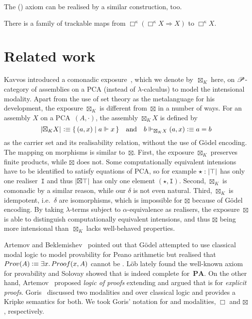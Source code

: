 \documentclass[a4paper,UKenglish,numberwithinsect,cleveref,thm-restate,draft]{lipics-v2021}
\numberwithin{equation}{section}
\theoremstyle{definition}
\theoremstyle{plain}
\begin{document}
The (\GL) axiom can be realised by a similar construction, too.
\begin{theorem}
  There is a family of trackable maps from 
  $\Box^\kappa (\Box^\kappa X \Rightarrow X)$ to $\Box^\kappa X$.
\end{theorem}

\section{Related work}
Kavvos introduced a comonadic exposure~\cite[Theorem~11]{Kavvos2017b}, which we denote by~$\boxtimes_K$ here, on $\mathscr{P}$-category of assemblies on a PCA (instead of $\lambda$-calculus) to model the intensional \SFour modality.
Apart from the use of set theory as the metalanguage for his development, the exposure $\boxtimes_K$ is different from~$\boxtimes$ in a number of ways.
For an assembly $X$ on a PCA~$(A, \cdot)$, the assembly $\boxtimes_K X$ is defined by
\[
\mathopen{}\left|\boxtimes_K X\right|_{}^{}\mathclose{} \vcentcolon\equiv \{\,(a, x) \mid a \Vdash x \,\}
\quad\text{and}\quad
b \Vdash_{\boxtimes_K X} (a, x) \vcentcolon\equiv a = b
\]
as the carrier set and its realisability relation, without the use of Gödel encoding.
The mapping on morphisms is similar to~$\boxtimes$.
First, the exposure $\boxtimes_K$ preserves finite products, while $\boxtimes$ does not.
Some computationally equivalent intensions have to be identified to satisfy equations of PCA, so for example
$\star : \mathopen{}\left|\top\right|_{}^{}\mathclose{}$ has only one realiser~$\mathtt{I}$ and thus $\mathopen{}\left|\boxtimes \top\right|_{}^{}\mathclose{}$ has only one element $(\star, \mathtt{I})$. 
Second, $\boxtimes_K$ is comonadic by a similar reason, while our $\delta$ is not even natural.
Third, $\boxtimes_K$ is idempotent, i.e.\ $\delta$ are isomorphisms, which is impossible for $\boxtimes$ because of Gödel encoding.
By taking $\lambda$-terms subject to $\alpha$-equivalence as realisers, the exposure~$\boxtimes$ is able to distinguish computationally equivalent intensions, and thus $\boxtimes$ being more intensional than~$\boxtimes_K$ lacks well-behaved properties.


Artemov and Beklemishev~\cite{Artemov2005} pointed out that
Gödel attempted to use classical \SFour modal logic to model provability for Peano arithmetic but realised that $\mathsf{Prov}(A) \defeq \exists x.\, \mathsf{Proof}(x, A)$ cannot be \SFour.
Löb lately found the well-known \GL axiom for provability and
Solovay showed that \GL is indeed complete for~$\mathbf{PA}$.
On the other hand, Artemov~\cite{Artemov2001} proposed \emph{logic of proofs} extending \SFour and argued that \SFour is for \emph{explicit proofs}.
Goris~\cite{Goris2009} discussed two modalities \GL and \SFour over classical logic and provides a Kripke semantics for both.
We took Goris' notation for \GL and \SFour modalities, $\Box$ and $\boxtimes$, respectively.
\end{document}
